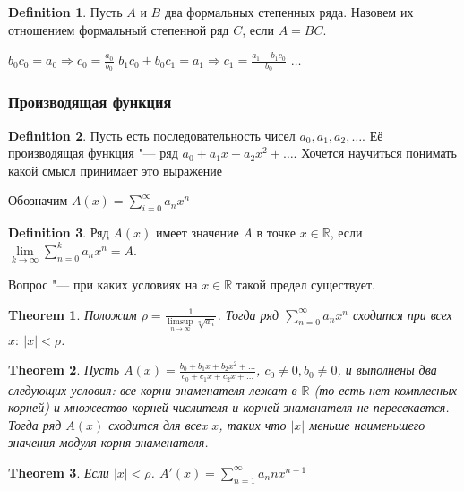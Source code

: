 \documentclass[a4paper]{article}
\theoremstyle{plain}
\newtheorem{theorem}{Theorem}
\theoremstyle{remark}
\theoremstyle{definition}
\newtheorem{definition}{Definition}
\newcommand{\myR}{\mathbb{R}}
\newcommand{\mysum}{\sum\limits}
\newcommand{\mylim}{\lim\limits}
\begin{document}
\begin{definition}
	Пусть $A$ и $B$ два формальных степенных ряда. Назовем их отношением формальный степенной ряд $C$, если $A = BC$. 	
\end{definition}

$b_0 c_0 = a_0 \Rightarrow c_0 = \frac{a_0}{b_0}$ \newline
$b_1 c_0 + b_0 c_1 = a_1 \Rightarrow c_1 = \frac{a_1 - b_1c_0}{b_0}$ \newline
$\ldots$ \newline

\subsubsection{Производящая функция}
\begin{definition}
	Пусть есть последовательность чисел $a_0, a_1, a_2, \ldots$. Её производящая функция "--- ряд $a_0 + a_1x + a_2x^2 + \ldots$. Хочется научиться понимать какой смысл принимает это выражение 
\end{definition}

Обозначим 
	$A(x) = \mysum_{i= 0}^{\infty} a_n x^n$

\begin{definition}
	Ряд $A(x)$ имеет значение $A$ в точке $x \in \myR$, если $\mylim_{k \to \infty} \mysum_{n=0}^k a_n x^n = A$.
\end{definition}

Вопрос "--- при каких условиях на $x \in \myR$ такой предел существует.

\begin{theorem} %
	Положим $\rho = \frac{1}{\limsup\limits_{n \to \infty} \sqrt[n]{a_n}}$. Тогда ряд $\mysum_{n=0}^{\infty}a_nx^n$ сходится при всех $x:\ |x| < \rho$.
\end{theorem}

\begin{theorem}
	Пусть $A(x) = \frac{b_0 + b_1x + b_2x^2 + \ldots}{c_0 + c_1x + c_2x + \ldots}$, $c_0 \neq 0, b_0 \neq 0$, и выполнены два следующих условия: все корни знаменателя лежат в $\myR$ (то есть нет комплесных корней) и множество корней числителя и корней знаменателя не пересекается. Тогда ряд $A(x)$ сходится для всеx $x$, таких что $|x|$ меньше наименьшего значения модуля корня знаменателя.
\end{theorem}

\begin{theorem}
	Если $|x| < \rho$. $A'(x) = \mysum_{n=1}^{\infty} a_n n x^{n-1}$
\end{theorem}
\end{document}
